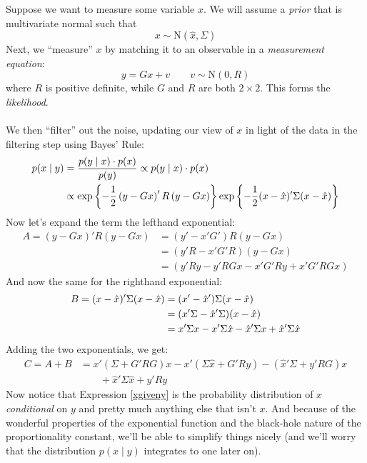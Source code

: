 \documentclass[a4paper,12pt]{scrartcl}
\begin{document}
Suppose we want to measure some variable $x$. We will 
assume a \emph{prior} that is multivariate normal such that
    \[ x \sim \text{N}(\hat{x}, \Sigma) \]
Next, we ``measure'' $x$ by matching it to an observable in
a \emph{measurement equation}:
    \[ y = G x + v \qquad v\sim \text{N}(0, R) \]
where $R$ is positive definite, while $G$ and $R$ are both 
$2 \times 2$. This forms the \emph{likelihood}.
\\
\\
We then ``filter'' out the noise, updating our view of $x$ in
light of the data in the filtering step using Bayes' Rule:
\begin{align}
    p(x \; | \; y) &= \frac{p(y \; | \; x) \cdot p(x)}{p(y)} 
    \propto p(y \; | \; x) \cdot p(x) \label{xgiveny} \\
    &\propto \exp\left\{-\frac{1}{2}
	\left( y - Gx \right)' R \left(y-Gx\right)
	\right\} \exp\left\{-\frac{1}{2}( x - \hat{x} )' \Sigma
	(x-\hat{x})\right\} \notag
\end{align}
Now let's expand the term the lefthand exponential:
\begin{align*}
    A = \left( y - Gx \right)' R \left(y-Gx\right) &= 
	\left( y' - x'G' \right) R \left(y-Gx\right) \\
    &= \left( y'R - x'G'R \right)  \left(y-Gx\right) \\
    &= \left( y'Ry - y'R Gx - x'G'R y + x'G'R Gx\right)
\end{align*}
And now the same for the righthand exponential:
\begin{align}
     B = ( x - \hat{x} )' \Sigma (x-\hat{x}) 
	&= ( x' - \hat{x}' ) \Sigma (x-\hat{x}) \notag\\
    &=  (x'\Sigma - \hat{x}'\Sigma)   (x-\hat{x}) \notag \\
    &=  x'\Sigma x - x'\Sigma \hat{x} - \hat{x}'\Sigma x
	+ \hat{x}'\Sigma \hat{x} \label{B}
\end{align}
Adding the two exponentials, we get:
\begin{align*}
    C = A + B &= x' \left( \Sigma + G'RG\right) x 
	- x' (\Sigma \hat{x} + G'Ry)
	- (\hat{x}' \Sigma + y' RG) x  \\
	& \qquad + \hat{x}' \Sigma \hat{x} + y' R y 
\end{align*}
Now notice that Expression \ref{xgiveny} is the probability
distribution of $x$ \emph{conditional} on $y$ and pretty
much anything else that isn't $x$.  And because of the
wonderful properties of the exponential function and the
black-hole nature of the proportionality constant, we'll be
able to simplify things nicely (and we'll worry that the
distribution $p(x\;|\;y)$ integrates to one later on).  
\end{document}
